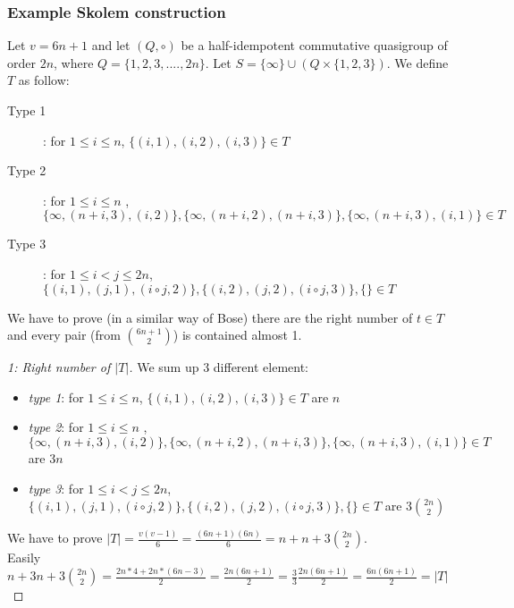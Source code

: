 \begin{frame}
\frametitle{Example Skolem construction}
Let $v = 6n +1$ and let $(Q, \circ)$ be a half-idempotent commutative quasigroup of order $2n$, where $Q = \{ 1,2,3,...., 2n\}$. Let $S = \{\infty\} \cup(Q \times \{1,2,3\})$. We define $T$ as follow:

\begin{description}
	\item[Type 1]: for $1 \le i \le n$, $\{ (i,1), (i,2), (i,3) \} \in T$ 
	\item[Type 2]: for $1 \le i \le n$ , $\{ \infty, (n+i,3),(i,2) \},\{ \infty, (n+i,2),(n+i,3) \},\{\infty,(n+i,3),(i,1) \} \in T$
	\item[Type 3]: for $1 \le i < j \le 2n$,$\{(i,1),(j,1),(i \circ j,2) \}, \{(i,2),(j,2),(i \circ j,3)\},\{\} \in T$
\end{description}
\end{frame}


\begin{frame}
We have to prove (in a similar way of Bose) there are the right number of $t \in T$ and every pair (from $\binom{6n + 1}{2}$) is contained almost 1.
\begin{proof}[1: Right number of $|T|$]
We sum up 3 different element:
\begin{itemize}
	\item \textit{type 1}: \textcolor{black!55}{for $1 \le i \le n$, $\{ (i,1), (i,2), (i,3)\} \in T$} are $n$
	\item \textit{type 2}: \textcolor{black!55}{ for $1 \le i \le n$ , $\{\infty, (n+i,3),(i,2)\},\{\infty,(n+i,2),(n+i,3)\},\{\infty,(n+i,3),(i,1) \} \in T$} are $3n$
	\item \textit{type 3}: \textcolor{black!55}{for $1 \le i < j \le 2n$,$\{(i,1),(j,1),(i \circ j,2) \}, \{(i,2),(j,2),(i \circ j,3)\},\{\} \in T$} are $3\binom{2n}{2}$
\end{itemize}
We have to prove $|T|= \frac{v(v-1)}{6} = \frac{(6n+1)(6n)}{6}= n + n + 3\binom{2n}{2}$.\\
Easily $n + 3n + 3\binom{2n}{2}=\frac{2n*4+ 2n*(6n-3)}{2}= \frac{2n(6n +1 )}{2}= \frac{3}{3}\frac{2n(6n +1 )}{2}=\frac{6n(6n +1 )}{2}=|T|$
\end{proof}
\end{frame}

